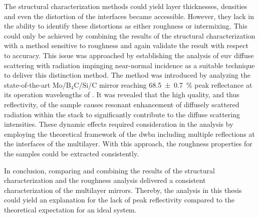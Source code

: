 The structural characterization methods could yield layer thicknesses, densities and even the distortion of the interfaces became accessible. However, they lack in the ability to identify these distortions as either roughness or intermixing. This could only be achieved by combining the results of the structural characterization with a method sensitive to roughness and again validate the result with respect to accuracy. This issue was approached by establishing the analysis of \gls{euv} diffuse scattering with radiation impinging near-normal incidence as a suitable technique to deliver this distinction method. The method was introduced by analyzing the state-of-the-art Mo/B$_4$C/Si/C mirror reaching \SI{68.5 \pm 0.7}{\percent} peak reflectance at its operation wavelengths of . It was revealed that the high quality, and thus reflectivity, of the sample causes resonant enhancement of diffusely scattered radiation within the stack to significantly contribute to the diffuse scattering intensities. These dynamic effects required consideration in the analysis by employing the theoretical framework of the \glsdesc{dwba} including multiple reflections at the interfaces of the multilayer. With this approach, the roughness properties for the samples could be extracted consistently.

In conclusion, comparing and combining the results of the structural characterization and the roughness analysis delivered a consistent characterization of the multilayer mirrors. Thereby, the analysis in this thesis could yield an explanation for the lack of peak reflectivity compared to the theoretical expectation for an ideal system.

